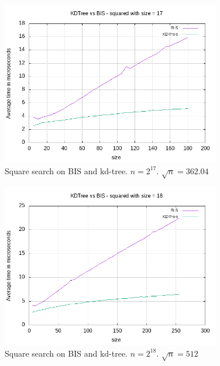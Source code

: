 \begin{figure}[h]
    \centering
    \includegraphics[width = 0.85\textwidth]{pictures/analysis/sqrt_17.png}
    \caption{Square search on BIS and kd-tree. $n=2^{17}$. $\sqrt{n} = 362.04$}\label{fig:sqrt_17}
\end{figure}


\begin{figure}[h]
    \centering
    \includegraphics[width = 0.85\textwidth]{pictures/analysis/sqrt_18.png}
    \caption{Square search on BIS and kd-tree. $n=2^{18}$. $\sqrt{n} = 512$}\label{fig:sqrt_18}
\end{figure}

